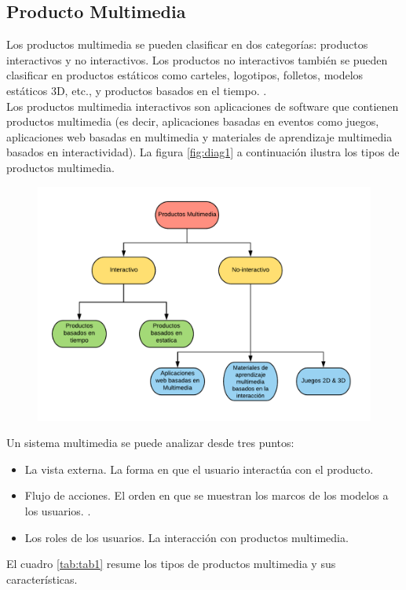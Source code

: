 \subsection{Producto Multimedia}
Los productos multimedia se pueden clasificar en dos categorías: productos interactivos y no interactivos. Los productos no interactivos también se pueden clasificar en 
productos estáticos como carteles, logotipos, folletos, modelos estáticos 3D, etc., y productos basados en el tiempo. \cite{engels2002object,sauer2001uml}.\\ 
\newline
Los productos multimedia interactivos son aplicaciones de software que contienen productos multimedia\cite{miranda2017diseno} (es decir, aplicaciones basadas en eventos 
como juegos, aplicaciones web basadas en multimedia y materiales de aprendizaje multimedia basados en interactividad).  La figura \ref{fig:diag1} a continuación ilustra 
los tipos de productos multimedia.\\
\begin{figure}[H]
	\begin{center}
 		\includegraphics[width = 1\textwidth]{source/images/image52.png}
	\end{center} 
\end{figure}

Un sistema multimedia se puede analizar desde tres puntos:
\begin{itemize}
\item La vista externa. La forma en que el usuario interactúa con el producto.
\item Flujo de acciones. El orden en que se muestran los marcos de los modelos a los usuarios. \cite{aleem2016game,cartwright1996pre}.
\item  Los roles de los usuarios. La interacción con productos multimedia.
\end{itemize} 
El cuadro \ref{tab:tab1} resume los tipos de productos multimedia y sus características.

